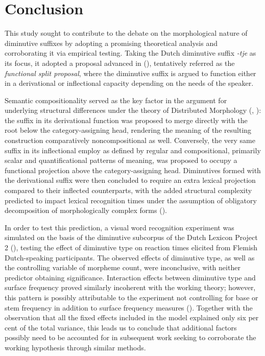 \chapter{Conclusion}\label{chp:conclusion}
This study sought to contribute to the debate on the morphological nature of diminutive suffixes by adopting a promising theoretical analysis and corroborating it via empirical testing. Taking the Dutch diminutive suffix \textit{-tje} as its focus, it adopted a proposal advanced in \citeauthor{DeBelder+etal+2014} (\citeyear{DeBelder+etal+2014}), tentatively referred as the \textit{functional split proposal}, where the diminutive suffix is argued to function either in a derivational or inflectional capacity depending on the needs of the speaker. 

Semantic compositionality served as the key factor in the argument for underlying structural differences under the theory of Distributed Morphology (\cite{Halle+Marantz+1993}, \citeyear{Halle+Marantz+1994}): the suffix in its derivational function was proposed to merge directly with the root below the category-assigning head, rendering the meaning of the resulting construction comparatively noncompositional as well. Conversely, the very same suffix in its inflectional employ as defined by regular and compositional, primarily scalar and quantificational patterns of meaning, was proposed to occupy a functional projection above the category-assigning head. Diminutives formed with the derivational suffix were then concluded to require an extra lexical projection compared to their inflected counterparts, with the added structural complexity predicted to impact lexical recognition times under the assumption of obligatory decomposition of morphologically complex forms (\cite{Taft+1979}).

In order to test this prediction, a visual word recognition experiment was simulated on the basis of the diminutive subcorpus of the Dutch Lexicon Project 2 (\cite{Brysbaert+etal+2016}), testing the effect of diminutive type on reaction times elicited from Flemish Dutch-speaking participants. The observed effects of diminutive type, as well as the controlling variable of morpheme count, were inconclusive, with neither predictor obtaining significance. Interaction effects between diminutive type and surface frequency proved similarly incoherent with the working theory; however, this pattern is possibly attributable to the experiment not controlling for base or stem frequency in addition to surface frequency measures (\cite{Taft+1979}). Together with the observation that all the fixed effects included in the model explained only six per cent of the total variance, this leads us to conclude that additional factors possibly need to be accounted for in subsequent work seeking to corroborate the working hypothesis through similar methods. 

